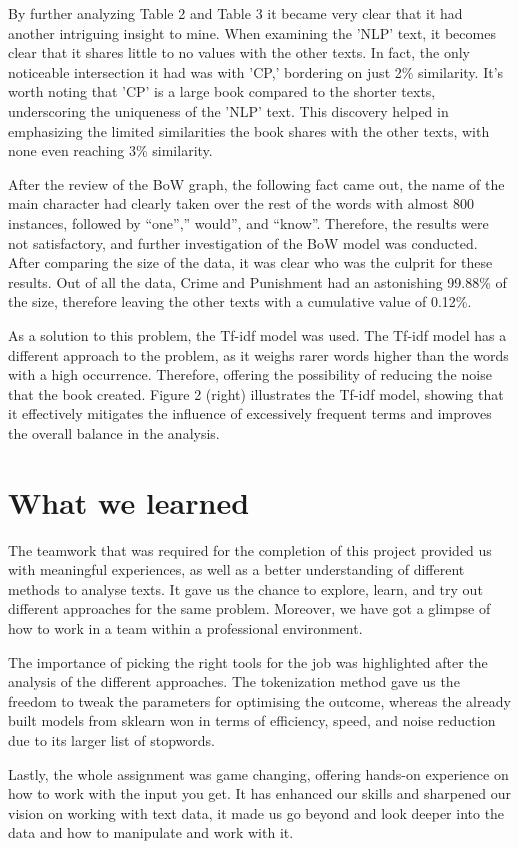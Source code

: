 \documentclass{article}
\begin{document}
\begin{multicols}{2}
By further analyzing Table 2 and Table 3 it became very clear that it had another intriguing insight to mine. When examining the 'NLP' text, it becomes clear that it shares little to no values with the other texts. In fact, the only noticeable intersection it had was with 'CP,' bordering on just 2\% similarity. It's worth noting that 'CP' is a large book compared to the shorter texts, underscoring the uniqueness of the 'NLP' text. This discovery helped in emphasizing the limited similarities the book shares with the other texts, with none even reaching 3\% similarity.

After the review of the BoW graph, the following fact came out, the name of the main character had clearly taken over the rest of the words with almost 800 instances, followed by “one”,” would”, and “know”. Therefore, the results were not satisfactory, and further investigation of the BoW model was conducted. After comparing the size of the data, it was clear who was the culprit for these results. Out of all the data, Crime and Punishment had an astonishing 99.88\% of the size, therefore leaving the other texts with a cumulative value of 0.12\%.

As a solution to this problem, the Tf-idf model was used. The Tf-idf model has a different approach to the problem, as it weighs rarer words higher than the words with a high occurrence. Therefore, offering the possibility of reducing the noise that the book created. Figure 2 (right) illustrates the Tf-idf model, showing that it effectively mitigates the influence of excessively frequent terms and improves the overall balance in the analysis.

\section{What we learned}

The teamwork that was required for the completion of this project provided us with meaningful experiences, as well as a better understanding of different methods to analyse texts. It gave us the chance to explore, learn, and try out different approaches for the same problem. Moreover, we have got a glimpse of how to work in a team within a professional environment.

The importance of picking the right tools for the job was highlighted after the analysis of the different approaches. The tokenization method gave us the freedom to tweak the parameters for optimising the outcome, whereas the already built models from sklearn won in terms of efficiency, speed, and noise reduction due to its larger list of stopwords.

Lastly, the whole assignment was game changing, offering hands-on experience on how to work with the input you get. It has enhanced our skills and sharpened our vision on working with text data, it made us go beyond and look deeper into the data and how to manipulate and work with it. 

\end{multicols}







\end{document}
